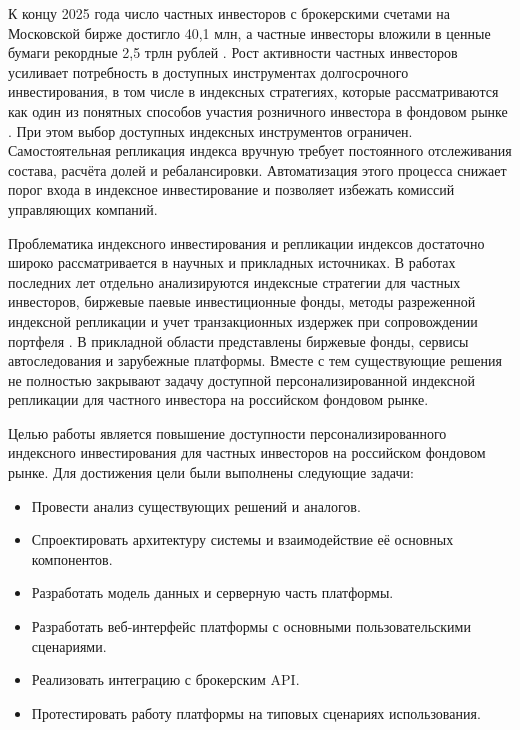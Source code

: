 \documentclass[14pt]{gost-7-32}
\begin{document}
\newpage
\introduction

К концу 2025 года число частных инвесторов с брокерскими счетами на Московской бирже достигло 40,1 млн, а частные инвесторы вложили в ценные бумаги рекордные 2,5 трлн рублей \cite{moexPrivateInvestors2025}. Рост активности частных инвесторов усиливает потребность в доступных инструментах долгосрочного инвестирования, в том числе в индексных стратегиях, которые рассматриваются как один из понятных способов участия розничного инвестора в фондовом рынке \cite{timofeevaIndexStrategy2026,zvyagintsevaBrokerCompetition2023}. При этом выбор доступных индексных инструментов ограничен. Самостоятельная репликация индекса вручную требует постоянного отслеживания состава, расчёта долей и ребалансировки. Автоматизация этого процесса снижает порог входа в индексное инвестирование и позволяет избежать комиссий управляющих компаний.

Проблематика индексного инвестирования и репликации индексов достаточно широко рассматривается в научных и прикладных источниках. В работах последних лет отдельно анализируются индексные стратегии для частных инвесторов, биржевые паевые инвестиционные фонды, методы разреженной индексной репликации и учет транзакционных издержек при сопровождении портфеля \cite{tatyannikovIndexStrategies2023,satpathySparseIndexTracking2022,hamiltonRussellTransactionCosts2024}. В прикладной области представлены биржевые фонды, сервисы автоследования и зарубежные платформы. Вместе с тем существующие решения не полностью закрывают задачу доступной персонализированной индексной репликации для частного инвестора на российском фондовом рынке.

Целью работы является повышение доступности персонализированного индексного инвестирования для частных инвесторов на российском фондовом рынке.
Для достижения цели были выполнены следующие задачи:

\begin{itemize}
  \item Провести анализ существующих решений и аналогов.
  \item Спроектировать архитектуру системы и взаимодействие её основных компонентов.
  \item Разработать модель данных и серверную часть платформы.
  \item Разработать веб-интерфейс платформы с основными пользовательскими сценариями.
  \item Реализовать интеграцию с брокерским API.
  \item Протестировать работу платформы на типовых сценариях использования.
\end{itemize}
\end{document}
